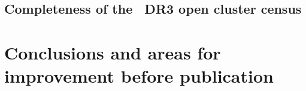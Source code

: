 \subsection{Completeness of the \gaia\ DR3 open cluster census}
\label{sec:dynamics:results:completeness}


\section{Conclusions and areas for improvement before publication}
\label{sec:dynamics:conclusion}

